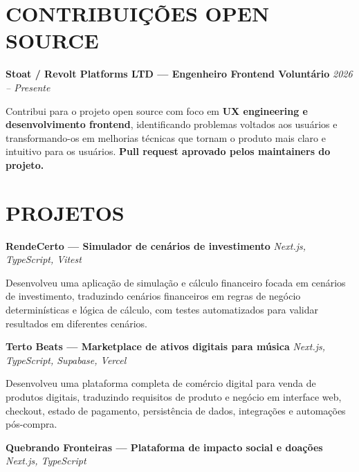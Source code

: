 \documentclass[10pt,a4paper]{article}
\begin{document}

\section*{CONTRIBUIÇÕES OPEN SOURCE}

\noindent
\textbf{Stoat / Revolt Platforms LTD — Engenheiro Frontend Voluntário}
\hfill
\textit{2026 -- Presente}

\footnotesize

Contribui para o projeto open source com foco em
\textbf{UX engineering e desenvolvimento frontend}, identificando
problemas voltados aos usuários e transformando-os em melhorias
técnicas que tornam o produto mais claro e intuitivo para os
usuários.
\textbf{Pull request aprovado pelos maintainers do projeto.}


\section*{PROJETOS}

\noindent
\textbf{RendeCerto — Simulador de cenários de investimento}
\hfill
\textit{Next.js, TypeScript, Vitest}

\footnotesize

Desenvolveu uma aplicação de simulação e cálculo financeiro
focada em cenários de investimento, traduzindo cenários financeiros
em regras de negócio determinísticas e lógica de cálculo, com
testes automatizados para validar resultados em diferentes
cenários.

\vspace{0.5pt}

\noindent
\textbf{Terto Beats — Marketplace de ativos digitais para música}
\hfill
\textit{Next.js, TypeScript, Supabase, Vercel}

\footnotesize

Desenvolveu uma plataforma completa de comércio digital para
venda de produtos digitais, traduzindo requisitos de produto e
negócio em interface web, checkout, estado de pagamento,
persistência de dados, integrações e automações pós-compra.

\vspace{0.5pt}

\noindent
\textbf{Quebrando Fronteiras — Plataforma de impacto social e doações}
\hfill
\textit{Next.js, TypeScript}
\end{document}
